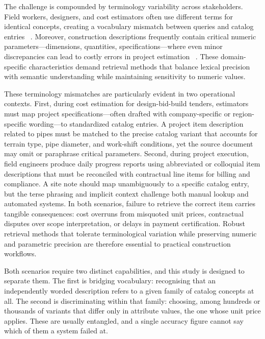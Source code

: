 \documentclass[preprint,12pt]{elsarticle}
\begin{document}
The challenge is compounded by terminology variability across stakeholders. Field workers, designers, and cost estimators often use different terms for identical concepts, creating a vocabulary mismatch between queries and catalog entries  ~\cite{chungComparingNaturalLanguage2023, role_martnezrojas_2016, rampiniArtificialIntelligenceConstruction2022, casiniAdvancedSiteManagement2022}. Moreover, construction descriptions frequently contain critical numeric parameters—dimensions, quantities, specifications—where even minor discrepancies can lead to costly errors in project estimation ~\cite{natural_wu_2022}. These domain-specific characteristics demand retrieval methods that balance lexical precision with semantic understanding while maintaining sensitivity to numeric values.

These terminology mismatches are particularly evident in two operational contexts. First, during cost estimation for design-bid-build tenders, estimators must map project specifications—often drafted with company-specific or region-specific wording—to standardized catalog entries. A project item description related to pipes must be matched to the precise catalog variant that accounts for terrain type, pipe diameter, and work-shift conditions, yet the source document may omit or paraphrase critical parameters. Second, during project execution, field engineers produce daily progress reports using abbreviated or colloquial item descriptions that must be reconciled with contractual line items for billing and compliance. A site note should map unambiguously to a specific catalog entry, but the terse phrasing and implicit context challenge both manual lookup and automated systems. In both scenarios, failure to retrieve the correct item carries tangible consequences: cost overruns from misquoted unit prices, contractual disputes over scope interpretation, or delays in payment certification. Robust retrieval methods that tolerate terminological variation while preserving numeric and parametric precision are therefore essential to practical construction workflows.

Both scenarios require two distinct capabilities, and this study is designed to separate them. The first is bridging vocabulary: recognising that an independently worded description refers to a given family of catalog concepts at all. The second is discriminating within that family: choosing, among hundreds or thousands of variants that differ only in attribute values, the one whose unit price applies. These are usually entangled, and a single accuracy figure cannot say which of them a system failed at.
\end{document}
